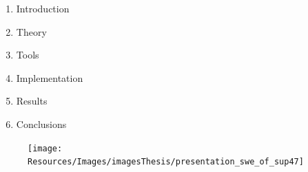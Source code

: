 \begin{frame}
   
   
\begin{minipage}{0.35\textwidth}
{\large
    \begin{enumerate}
     \itemsep3ex
    \item<2-> Introduction
    \item<3-> Theory 
    \item<4->  Tools 
    \item<5-> Implementation
    \item<6-> Results
    \item<6-> Conclusions
    \end{enumerate}
}
\end{minipage}
\begin{minipage}{0.4\textwidth}
     \begin{figure}
     \texttt{[image: Resources/Images/imagesThesis/presentation\_swe\_of\_sup47]}
     \end{figure}
\end{minipage}   
\end{frame}
\clearpage


